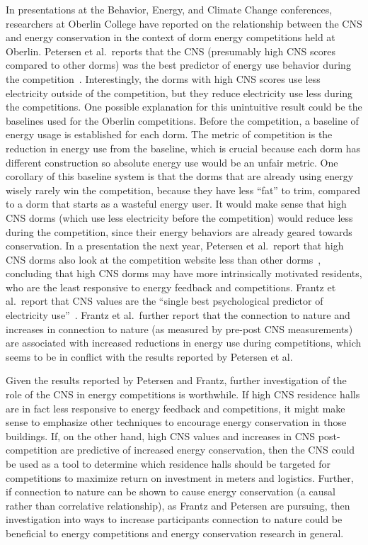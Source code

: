 In presentations at the Behavior, Energy, and Climate Change conferences, researchers at Oberlin College have reported on the relationship between the CNS and energy conservation in the context of dorm energy competitions held at Oberlin. Petersen et al.\ reports that the CNS (presumably high CNS scores compared to other dorms) was the best predictor of energy use behavior during the competition~\cite{Petersen2010}. Interestingly, the dorms with high CNS scores use less electricity outside of the competition, but they reduce electricity use less during the competitions. One possible explanation for this unintuitive result could be the baselines used for the Oberlin competitions. Before the competition, a baseline of energy usage is established for each dorm. The metric of competition is the reduction in energy use from the baseline, which is crucial because each dorm has different construction so absolute energy use would be an unfair metric. One corollary of this baseline system is that the dorms that are already using energy wisely rarely win the competition, because they have less ``fat'' to trim, compared to a dorm that starts as a wasteful energy user. It would make sense that high CNS dorms (which use less electricity before the competition) would reduce less during the competition, since their energy behaviors are already geared towards conservation. In a presentation the next year, Petersen et al.\ report that high CNS dorms also look at the competition website less than other dorms~\cite{Petersen2011}, concluding that high CNS dorms may have more intrinsically motivated residents, who are the least responsive to energy feedback and competitions. Frantz et al.\ report that CNS values are the ``single best psychological predictor of electricity use''~\cite{Frantz2011}. Frantz et al.\ further report that the connection to nature and increases in connection to nature (as measured by pre-post CNS measurements) are associated with increased reductions in energy use during competitions, which seems to be in conflict with the results reported by Petersen et al.

Given the results reported by Petersen and Frantz, further investigation of the role of the CNS in energy competitions is worthwhile. If high CNS residence halls are in fact less responsive to energy feedback and competitions, it might make sense to emphasize other techniques to encourage energy conservation in those buildings. If, on the other hand, high CNS values and increases in CNS post-competition are predictive of increased energy conservation, then the CNS could be used as a tool to determine which residence halls should be targeted for competitions to maximize return on investment in meters and logistics. Further, if connection to nature can be shown to cause energy conservation (a causal rather than correlative relationship), as Frantz and Petersen are pursuing, then investigation into ways to increase participants connection to nature could be beneficial to energy competitions and energy conservation research in general.


